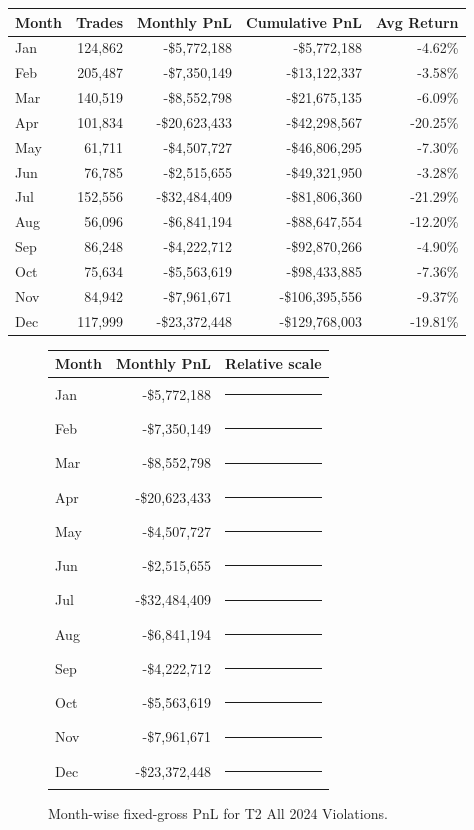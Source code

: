 \documentclass[11pt]{article}
\begin{document}
\begin{center}
\begin{tabular}{@{}lrrrr@{}}
\toprule
Month & Trades & Monthly PnL & Cumulative PnL & Avg Return \\
\midrule
Jan & 124,862 & -\$5,772,188 & -\$5,772,188 & -4.62\% \\
Feb & 205,487 & -\$7,350,149 & -\$13,122,337 & -3.58\% \\
Mar & 140,519 & -\$8,552,798 & -\$21,675,135 & -6.09\% \\
Apr & 101,834 & -\$20,623,433 & -\$42,298,567 & -20.25\% \\
May & 61,711 & -\$4,507,727 & -\$46,806,295 & -7.30\% \\
Jun & 76,785 & -\$2,515,655 & -\$49,321,950 & -3.28\% \\
Jul & 152,556 & -\$32,484,409 & -\$81,806,360 & -21.29\% \\
Aug & 56,096 & -\$6,841,194 & -\$88,647,554 & -12.20\% \\
Sep & 86,248 & -\$4,222,712 & -\$92,870,266 & -4.90\% \\
Oct & 75,634 & -\$5,563,619 & -\$98,433,885 & -7.36\% \\
Nov & 84,942 & -\$7,961,671 & -\$106,395,556 & -9.37\% \\
Dec & 117,999 & -\$23,372,448 & -\$129,768,003 & -19.81\% \\
\bottomrule
\end{tabular}
\end{center}

\begin{figure}[h]
\centering
\begin{tabular}{@{}lrl@{}}
\toprule
Month & Monthly PnL & Relative scale \\
\midrule
Jan & -\$5,772,188 & \textcolor{red}{\rule{1.8cm}{7pt}}\\
Feb & -\$7,350,149 & \textcolor{red}{\rule{2.3cm}{7pt}}\\
Mar & -\$8,552,798 & \textcolor{red}{\rule{2.6cm}{7pt}}\\
Apr & -\$20,623,433 & \textcolor{red}{\rule{6.3cm}{7pt}}\\
May & -\$4,507,727 & \textcolor{red}{\rule{1.4cm}{7pt}}\\
Jun & -\$2,515,655 & \textcolor{red}{\rule{0.8cm}{7pt}}\\
Jul & -\$32,484,409 & \textcolor{red}{\rule{10.0cm}{7pt}}\\
Aug & -\$6,841,194 & \textcolor{red}{\rule{2.1cm}{7pt}}\\
Sep & -\$4,222,712 & \textcolor{red}{\rule{1.3cm}{7pt}}\\
Oct & -\$5,563,619 & \textcolor{red}{\rule{1.7cm}{7pt}}\\
Nov & -\$7,961,671 & \textcolor{red}{\rule{2.5cm}{7pt}}\\
Dec & -\$23,372,448 & \textcolor{red}{\rule{7.2cm}{7pt}}\\
\bottomrule
\end{tabular}
\caption{Month-wise fixed-gross PnL for T2 All 2024 Violations.}
\end{figure}
\end{document}
